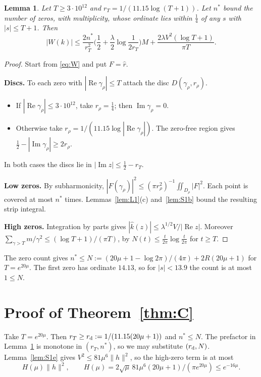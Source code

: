 \documentclass[11pt]{amsart}
\newtheorem{lemma}[proposition]{Lemma}
\theoremstyle{remark}
\numberwithin{equation}{section}
\begin{document}
\begin{lemma}\label{lem:S1c}
Let $T\ge3\cdot10^{12}$ and $r_T=1/(11.15\log(T+1))$. Let $n^*$ bound the number of zeros, with multiplicity, whose ordinate lies within $\frac14$ of any $s$ with $|s|\le T+1$. Then
\[
|W(k)|\le\frac{2n^*}{r_T^2}\Big(\frac12+\frac\lambda2\log\frac1{2r_T}\Big)M+\frac{2\lambda V^2(\log T+1)}{\pi T}.
\]
\end{lemma}
\begin{proof}
Start from \eqref{eq:W} and put $F=\hat r$.

\textbf{Discs.} To each zero with $|\operatorname{Re}\gamma_\rho|\le T$ attach the disc $D(\gamma_\rho,r_\rho)$.
\begin{itemize}
\item If $|\operatorname{Re}\gamma_\rho|\le3\cdot10^{12}$, take $r_\rho=\frac14$; then $\operatorname{Im}\gamma_\rho=0$.
\item Otherwise take $r_\rho=1/(11.15\log|\operatorname{Re}\gamma_\rho|)$. The zero-free region gives $\frac12-|\operatorname{Im}\gamma_\rho|\ge2r_\rho$.
\end{itemize}
In both cases the discs lie in $|\operatorname{Im}z|\le\frac12-r_T$.

\textbf{Low zeros.} By subharmonicity, $|F(\gamma_\rho)|^2\le(\pi r_\rho^2)^{-1}\iint_{D_\rho}|F|^2$. Each point is covered at most $n^*$ times. Lemmas~\ref{lem:L1}(c) and~\ref{lem:S1b} bound the resulting strip integral.

\textbf{High zeros.} Integration by parts gives $|\hat k(z)|\le\lambda^{1/2}V/|\operatorname{Re}z|$. Moreover $\sum_{\gamma>T}m/\gamma^2\le(\log T+1)/(\pi T)$, by $N(t)\le\frac t{2\pi}\log\frac t{2\pi}$ for $t\ge T$.
\end{proof}

The zero count gives $n^*\le N:=(20\mu+1-\log2\pi)/(4\pi)+2R(20\mu+1)$ for $T=e^{20\mu}$. The first zero has ordinate $14.13$, so for $|s|<13.9$ the count is at most $1\le N$.

\section{Proof of Theorem~\ref{thm:C}}\label{sec:C}
Take $T=e^{20\mu}$. Then $r_T\ge r_{\rm d}:=1/(11.15(20\mu+1))$ and $n^*\le N$. The prefactor in Lemma~\ref{lem:S1c} is monotone in $(r_T,n^*)$, so we may substitute $(r_{\rm d},N)$. Lemma~\ref{lem:S1e} gives $V^2\le81\mu^6\|h\|^2$, so the high-zero term is at most
\[
H(\mu)\|h\|^2,\qquad H(\mu)=2\sqrt\mu\,81\mu^6(20\mu+1)/(\pi e^{20\mu})\le e^{-16\mu}.
\]
\end{document}
